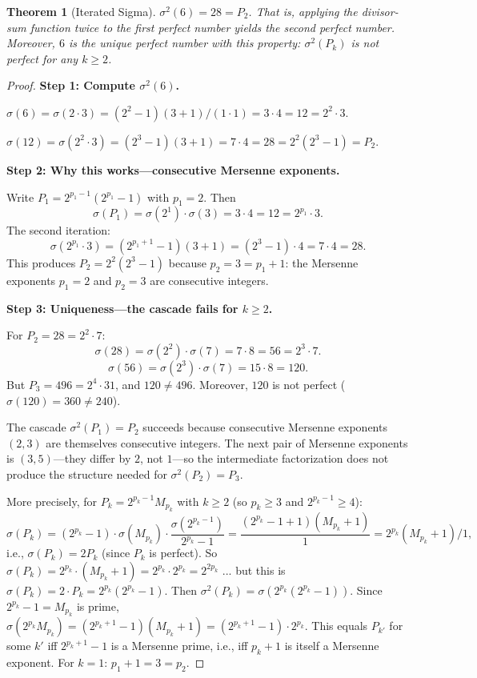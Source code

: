 \documentclass[11pt]{amsart}
\newtheorem{theorem}{Theorem}
\theoremstyle{remark}
\begin{document}
\begin{theorem}[Iterated Sigma]\label{thm:iterated-sigma}
$\sigma^2(6) = 28 = P_2$. That is, applying the divisor-sum function
twice to the first perfect number yields the second perfect number.
Moreover, $6$ is the unique perfect number with this property:
$\sigma^2(P_k)$ is not perfect for any $k \geq 2$.
\end{theorem}

\begin{proof}
\textbf{Step 1: Compute $\sigma^2(6)$.}

$\sigma(6) = \sigma(2 \cdot 3) = (2^2 - 1)(3 + 1)/(1 \cdot 1)
= 3 \cdot 4 = 12 = 2^2 \cdot 3$.

$\sigma(12) = \sigma(2^2 \cdot 3) = (2^3 - 1)(3 + 1) = 7 \cdot 4 = 28
= 2^2(2^3 - 1) = P_2$.

\textbf{Step 2: Why this works---consecutive Mersenne exponents.}

Write $P_1 = 2^{p_1 - 1}(2^{p_1} - 1)$ with $p_1 = 2$.
Then
\[
  \sigma(P_1) = \sigma(2^1) \cdot \sigma(3) = 3 \cdot 4 = 12 = 2^{p_1} \cdot 3.
\]
The second iteration:
\[
  \sigma(2^{p_1} \cdot 3) = (2^{p_1 + 1} - 1)(3 + 1) = (2^3 - 1) \cdot 4 = 7 \cdot 4 = 28.
\]
This produces $P_2 = 2^2(2^3 - 1)$ because $p_2 = 3 = p_1 + 1$:
the Mersenne exponents $p_1 = 2$ and $p_2 = 3$ are consecutive integers.

\textbf{Step 3: Uniqueness---the cascade fails for $k \geq 2$.}

For $P_2 = 28 = 2^2 \cdot 7$:
\[
  \sigma(28) = \sigma(2^2) \cdot \sigma(7) = 7 \cdot 8 = 56 = 2^3 \cdot 7.
\]
\[
  \sigma(56) = \sigma(2^3) \cdot \sigma(7) = 15 \cdot 8 = 120.
\]
But $P_3 = 496 = 2^4 \cdot 31$, and $120 \neq 496$. Moreover,
$120$ is not perfect ($\sigma(120) = 360 \neq 240$).

The cascade $\sigma^2(P_1) = P_2$ succeeds because consecutive
Mersenne exponents $(2, 3)$ are themselves consecutive integers.
The next pair of Mersenne exponents is $(3, 5)$---they differ by $2$,
not $1$---so the intermediate factorization does not produce the
structure needed for $\sigma^2(P_2) = P_3$.

More precisely, for $P_k = 2^{p_k - 1} M_{p_k}$ with $k \geq 2$
(so $p_k \geq 3$ and $2^{p_k - 1} \geq 4$):
\[
  \sigma(P_k) = (2^{p_k} - 1) \cdot \sigma(M_{p_k}) \cdot \frac{\sigma(2^{p_k-1})}{2^{p_k}-1}
  = \frac{(2^{p_k} - 1 + 1)(M_{p_k} + 1)}{1} = 2^{p_k}(M_{p_k} + 1)/1,
\]
i.e., $\sigma(P_k) = 2P_k$ (since $P_k$ is perfect).
So $\sigma(P_k) = 2^{p_k} \cdot (M_{p_k} + 1) = 2^{p_k} \cdot 2^{p_k} = 2^{2p_k}$
... but this is $\sigma(P_k) = 2 \cdot P_k = 2^{p_k}(2^{p_k}-1)$.
Then $\sigma^2(P_k) = \sigma(2^{p_k}(2^{p_k}-1))$.
Since $2^{p_k} - 1 = M_{p_k}$ is prime,
$\sigma(2^{p_k} M_{p_k}) = (2^{p_k+1}-1)(M_{p_k}+1) = (2^{p_k+1}-1) \cdot 2^{p_k}$.
This equals $P_{k'}$ for some $k'$ iff $2^{p_k+1}-1$ is a Mersenne prime,
i.e., iff $p_k + 1$ is itself a Mersenne exponent.
For $k = 1$: $p_1 + 1 = 3 = p_2$. \checkmark


\end{proof}
\end{document}
